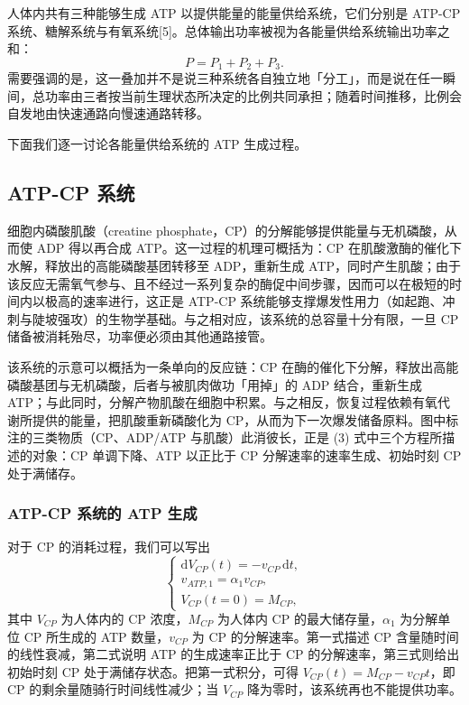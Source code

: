 \documentclass[11pt,a4paper]{ctexart}
\begin{document}
人体内共有三种能够生成 ATP 以提供能量的能量供给系统，它们分别是 ATP-CP 系统、糖解系统与有氧系统[5]。总体输出功率被视为各能量供给系统输出功率之和：
\begin{equation}
P=P_1+P_2+P_3.
\end{equation}
需要强调的是，这一叠加并不是说三种系统各自独立地「分工」，而是说在任一瞬间，总功率由三者按当前生理状态所决定的比例共同承担；随着时间推移，比例会自发地由快速通路向慢速通路转移。

下面我们逐一讨论各能量供给系统的 ATP 生成过程。

\subsection{ATP-CP 系统}

细胞内磷酸肌酸（creatine phosphate，CP）的分解能够提供能量与无机磷酸，从而使 ADP 得以再合成 ATP。这一过程的机理可概括为：CP 在肌酸激酶的催化下水解，释放出的高能磷酸基团转移至 ADP，重新生成 ATP，同时产生肌酸；由于该反应无需氧气参与、且不经过一系列复杂的酶促中间步骤，因而可以在极短的时间内以极高的速率进行，这正是 ATP-CP 系统能够支撑爆发性用力（如起跑、冲刺与陡坡强攻）的生物学基础。与之相对应，该系统的总容量十分有限，一旦 CP 储备被消耗殆尽，功率便必须由其他通路接管。

该系统的示意可以概括为一条单向的反应链：CP 在酶的催化下分解，释放出高能磷酸基团与无机磷酸，后者与被肌肉做功「用掉」的 ADP 结合，重新生成 ATP；与此同时，分解产物肌酸在细胞中积累。与之相反，恢复过程依赖有氧代谢所提供的能量，把肌酸重新磷酸化为 CP，从而为下一次爆发储备原料。图中标注的三类物质（CP、ADP/ATP 与肌酸）此消彼长，正是 (3) 式中三个方程所描述的对象：CP 单调下降、ATP 以正比于 CP 分解速率的速率生成、初始时刻 CP 处于满储存。

\subsubsection{ATP-CP 系统的 ATP 生成}

对于 CP 的消耗过程，我们可以写出
\begin{equation}
\begin{cases}
\mathrm{d}V_{CP}(t)=-v_{CP}\,\mathrm{d}t,\\[0.3em]
v_{ATP,1}=\alpha_1 v_{CP},\\[0.3em]
V_{CP}(t=0)=M_{CP},
\end{cases}
\end{equation}
其中 $V_{CP}$ 为人体内的 CP 浓度，$M_{CP}$ 为人体内 CP 的最大储存量，$\alpha_1$ 为分解单位 CP 所生成的 ATP 数量，$v_{CP}$ 为 CP 的分解速率。第一式描述 CP 含量随时间的线性衰减，第二式说明 ATP 的生成速率正比于 CP 的分解速率，第三式则给出初始时刻 CP 处于满储存状态。把第一式积分，可得 $V_{CP}(t)=M_{CP}-v_{CP}t$，即 CP 的剩余量随骑行时间线性减少；当 $V_{CP}$ 降为零时，该系统再也不能提供功率。
\end{document}
